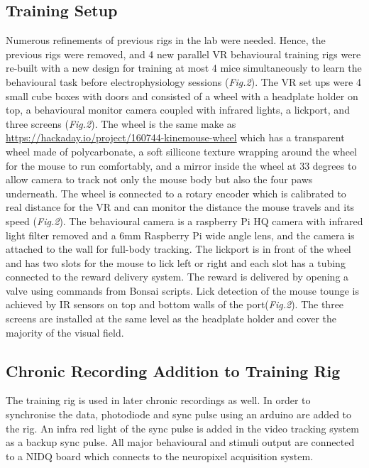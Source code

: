 \subsection{Training Setup}
Numerous refinements of previous rigs in the lab were needed. Hence, the previous rigs were removed, and 4 new parallel VR behavioural training rigs were re-built with a new design for training at most 4 mice simultaneously to learn the behavioural task before electrophysiology sessions (\textit{Fig.2}). The VR set ups were 4 small cube boxes with doors and consisted of a wheel with a headplate holder on top, a behavioural monitor camera coupled with infrared lights, a lickport, and three screens (\textit{Fig.2}). The wheel is the same make as \href{https://hackaday.io/project/160744-kinemouse-wheel}{https://hackaday.io/project/160744-kinemouse-wheel} which has a transparent wheel made of polycarbonate, a soft sillicone texture wrapping around the wheel for the mouse to run comfortably, and a mirror inside the wheel at 33 degrees to allow camera to track not only the mouse body but also the four paws underneath. The wheel is connected to a rotary encoder which is calibrated to real distance for the VR and can monitor the distance the mouse travels and its speed (\textit{Fig.2}). The behavioural camera is a raspberry Pi HQ camera with infrared light filter removed and a 6mm Raspberry Pi wide angle lens, and the camera is attached to the wall for full-body tracking. The lickport is in front of the wheel and has two slots for the mouse to lick left or right and each slot has a tubing connected to the reward delivery system. The reward is delivered by opening a valve using commands from Bonsai scripts. Lick detection of the mouse tounge is achieved by IR sensors on top and bottom walls of the port(\textit{Fig.2}). The three screens are installed at the same level as the headplate holder and cover the majority of the visual field.


\subsection{Chronic Recording Addition to Training Rig}
The training rig is used in later chronic recordings as well. In order to synchronise the data, photodiode and sync pulse using an arduino are added to the rig. An infra red light of the sync pulse is added in the video tracking system as a backup sync pulse. All major behavioural and stimuli output are connected to a NIDQ board which connects to the neuropixel acquisition system.

